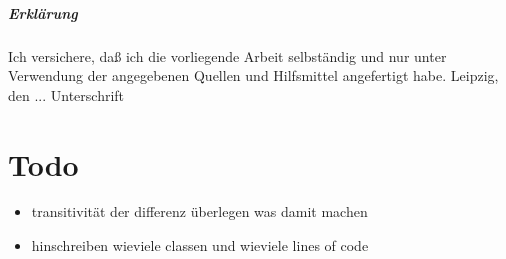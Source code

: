 \documentclass[a4paper,12pt]{report}
\begin{document}

\newpage

\paragraph{Erklärung}Ich versichere, daß ich die vorliegende Arbeit selbständig und nur unter
Verwendung der angegebenen Quellen und Hilfsmittel angefertigt habe.
Leipzig, den ...                         Unterschrift


\chapter{Todo}
\begin{itemize}
  \item transitivität der differenz überlegen was damit machen
  \item hinschreiben wieviele classen und wieviele lines of code

\end{itemize}

%

\end{document}
